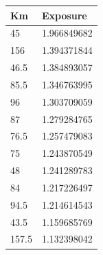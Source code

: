 \begin{longtable}{|l|l|}
	\centering
	\rowcolor[HTML]{9B9B9B} \textbf{Km} & \textbf{Exposure} \\ \hline
	\rowcolor[HTML]{FE0000} 45                                                      & 1.966849682                                                   \\
 \rowcolor[HTML]{FE0000} 
 156                                                     & 1.394371844                                                   \\
 \rowcolor[HTML]{FE0000} 
 46.5                                                    & 1.384893057                                                   \\
 \rowcolor[HTML]{FE0000} 
 85.5                                                    & 1.346763995                                                   \\
 \rowcolor[HTML]{FE0000} 
 96                                                      & 1.303709059                                                   \\
 \rowcolor[HTML]{FE0000} 
 87                                                      & 1.279284765                                                   \\
 \rowcolor[HTML]{FE0000} 
 76.5                                                    & 1.257479083                                                   \\
 \rowcolor[HTML]{FE0000} 
 75                                                      & 1.243870549                                                   \\
 \rowcolor[HTML]{FE0000} 
 48                                                      & 1.241289783                                                   \\
 \rowcolor[HTML]{FE0000} 
 84                                                      & 1.217226497                                                   \\
 \rowcolor[HTML]{FE0000} 
 94.5                                                    & 1.214614543                                                   \\
 \rowcolor[HTML]{FE0000} 
 43.5                                                    & 1.159685769                                                   \\
 \rowcolor[HTML]{FE0000} 
 157.5                                                   & 1.132398042                                                   \\

\end{longtable}
